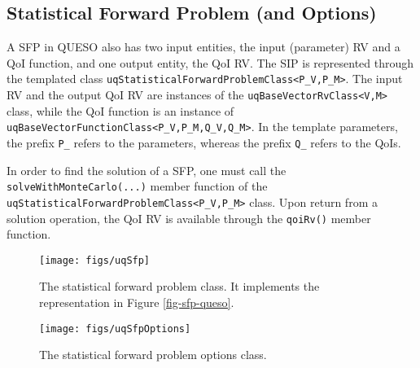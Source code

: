 \subsection{Statistical Forward Problem (and Options)}

A SFP in QUESO also has two input entities, the input (parameter) RV and a QoI function, and one output entity, the QoI RV. 
The SIP is represented through the templated class \verb+uqStatisticalForwardProblemClass<P_V,P_M>+.
The input RV and the output QoI RV are instances of the \verb+uqBaseVectorRvClass<V,M>+ class, while
the QoI function is an instance of \verb+uqBaseVectorFunctionClass<P_V,P_M,Q_V,Q_M>+.
In the template parameters, the prefix \verb+P_+ refers to the parameters, whereas the prefix \verb+Q_+ refers to the QoIs.

In order to find the solution of a SFP, one must call the \verb+solveWithMonteCarlo(...)+ member function of the \verb+uqStatisticalForwardProblemClass<P_V,P_M>+ class.
Upon return from a solution operation, the QoI RV is available through the \verb+qoiRv()+ member function.

\begin{figure}[htpb]
\centering
\texttt{[image: figs/uqSfp]}
\vspace*{-8pt}
\caption{The statistical forward problem class. It implements the representation in Figure \ref{fig-sfp-queso}.}
\label{fig-sfp-class}
\end{figure}

\begin{figure}[htpb]
\centering
\texttt{[image: figs/uqSfpOptions]}
\vspace*{-8pt}
\caption{The statistical forward problem options class.}
\label{fig-sfp-options-class}
\end{figure}

